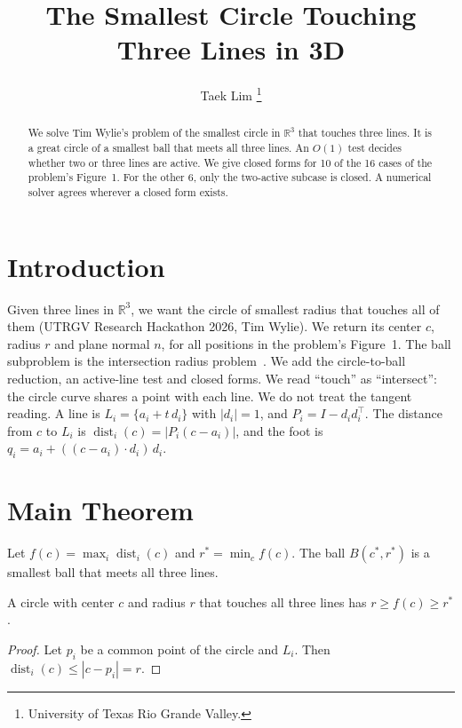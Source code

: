 \documentclass[10pt]{hackr26}
\title{The Smallest Circle Touching Three Lines in 3D}
\author{
    Taek Lim
    \thanks{University of Texas Rio Grande Valley.}
}
\date{}
\newcommand{\dist}{\operatorname{dist}}
\newcommand{\R}{\mathbb{R}}
\begin{document}
\maketitle
\small\setlength{\baselineskip}{10pt}
\begin{abstract}
We solve Tim Wylie's problem of the smallest circle in $\R^3$ that touches three lines.
It is a great circle of a smallest ball that meets all three lines.
An $O(1)$ test decides whether two or three lines are active.
We give closed forms for 10 of the 16 cases of the problem's Figure~1.
For the other 6, only the two-active subcase is closed.
A numerical solver agrees wherever a closed form exists.
\end{abstract}

\section{Introduction} \label{sec:intro}
Given three lines in $\R^3$, we want the circle of smallest radius that touches all of them (UTRGV Research Hackathon 2026, Tim Wylie).
We return its center $c$, radius $r$ and plane normal $n$, for all positions in the problem's Figure~1.
The ball subproblem is the intersection radius problem~\cite{BJMR94}.
We add the circle-to-ball reduction, an active-line test and closed forms.
We read ``touch'' as ``intersect'': the circle curve shares a point with each line.
We do not treat the tangent reading.
A line is $L_i=\{a_i+t\,d_i\}$ with $|d_i|=1$, and $P_i=I-d_id_i^{\top}$.
The distance from $c$ to $L_i$ is $\dist_i(c)=|P_i(c-a_i)|$, and the foot is $q_i=a_i+((c-a_i)\cdot d_i)\,d_i$.

\section{Main Theorem} \label{sec:thm}
Let $f(c)=\max_i \dist_i(c)$ and $r^*=\min_c f(c)$.
The ball $B(c^*,r^*)$ is a smallest ball that meets all three lines.

\begin{lemma}\label{lem:lower}
A circle with center $c$ and radius $r$ that touches all three lines has $r\ge f(c)\ge r^*$.
\end{lemma}
\begin{proof}
Let $p_i$ be a common point of the circle and $L_i$. Then $\dist_i(c)\le |c-p_i|=r$.
\end{proof}
\end{document}
